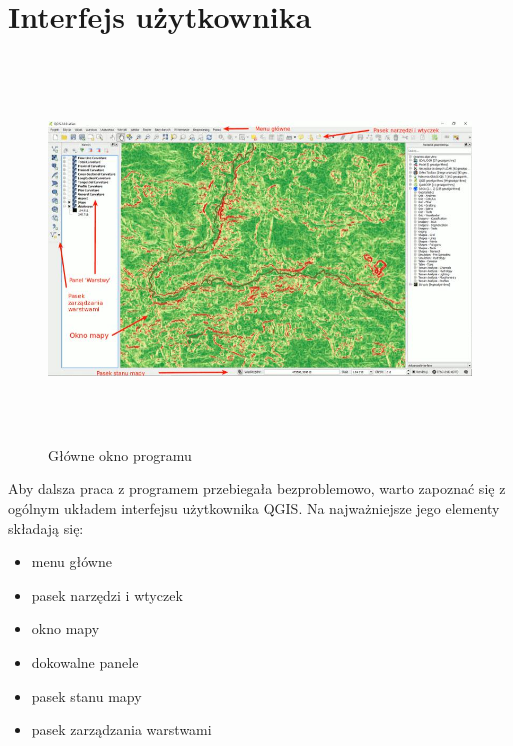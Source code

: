 \documentclass[12pt,a4paper]{book}
\begin{document}
\section{Interfejs użytkownika}
\begin{center}
\begin{figure}
\includegraphics[width=17cm,height=10.216cm]{001-interfejs.jpg}
\caption{Główne okno programu}
\end{figure}
\end{center}
Aby dalsza praca z programem przebiegała bezproblemowo, warto zapoznać się z ogólnym układem interfejsu użytkownika QGIS. Na najważniejsze jego elementy składają się:

\begin{itemize}
\item menu główne
\item pasek narzędzi i wtyczek
\item okno mapy
\item dokowalne panele
\item pasek stanu mapy
\item pasek zarządzania warstwami
\end{itemize}
\end{document}
